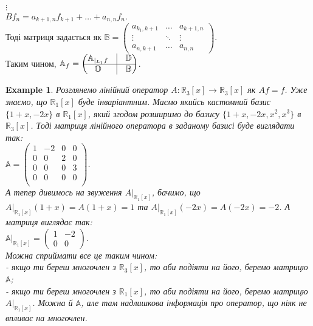 \documentclass[a4paper, 10pt]{article}
\theoremstyle{theoremdd}
\newtheorem{example}[theorem]{Example}
\begin{document}
$\vdots$\\
$Bf_{n} = a_{k+1,n}f_{k+1} + \dots + a_{n,n}f_n$.\\
Тоді матриця задається як $\mathbb{B} = \begin{pmatrix}
a_{k_1,k+1} & \dots & a_{k+1,n} \\
\vdots & \ddots & \vdots \\
a_{n,k+1} & \dots & a_{n,n}
\end{pmatrix}$.\\
Таким чином, $\mathbb{A}_f = \begin{pmatrix}
 \mathbb{A}_{|_{L_1}f}  & \vline & \mathbb{D} \\
 \hline
 \mathbb{O} & \vline & \mathbb{B}
\end{pmatrix}$.
\fi

\begin{example}
Розглянемо лінійний оператор $A \colon \mathbb{R}_3[x] \to \mathbb{R}_3[x]$ як $Af = f$. Уже знаємо, що $\mathbb{R}_1[x]$ буде інваріантним. Маємо якийсь кастомний базис $\{1+x,-2x\}$ в $\mathbb{R}_1[x]$, який згодом розширимо до базису $\{1+x,-2x,x^2,x^3\}$ в $\mathbb{R}_3[x]$.
Тоді матриця лінійного оператора в заданому базисі буде виглядати так:\\
$\mathbb{A} = \begin{pmatrix}
1 & -2 & 0 & 0 \\
0 & 0 & 2 & 0 \\
0 & 0 & 0 & 3 \\
0 & 0 & 0 & 0 \\
\end{pmatrix}$.\\
А тепер дивимось на звуження $A|_{\mathbb{R}_1[x]}$, бачимо, що $A|_{\mathbb{R}_1[x]}(1+x) = A(1+x) = 1$ та $A|_{\mathbb{R}_1[x]}(-2x) = A(-2x) = -2$. А матриця виглядає так:\\
$\mathbb{A}|_{\mathbb{R}_1[x]} = \begin{pmatrix}
1 & -2 \\
0 & 0
\end{pmatrix}$.\\
Можна сприймати все це таким чином:\\
- якщо ти береш многочлен з $\mathbb{R}_3[x]$, то аби подіяти на його, беремо матрицю $\mathbb{A}$;\\
- якщо ти береш многочлен з $\mathbb{R}_1[x]$, то аби подіяти на його, беремо матрицю $A|_{\mathbb{R}_1[x]}$. Можна й $\mathbb{A}$, але там надлишкова інформація про оператор, що ніяк не впливає на многочлен.
\end{example}
\end{document}
